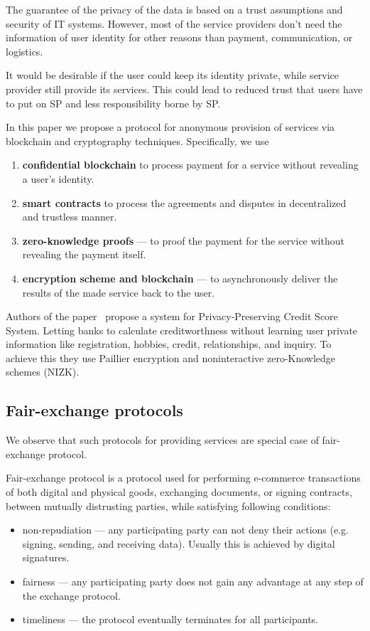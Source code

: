 \documentclass{article}
\begin{document}
The guarantee of the privacy of the data is based on a trust assumptions and security of IT systems. However, most of the service providers don't need the information of user identity for other reasons than payment, communication, or logistics. 

It would be desirable if the user could keep its identity private, while service provider still provide its services. This could lead to reduced trust that users have to put on SP and less responsibility borne by SP.

In this paper we propose a protocol for anonymous provision of services via blockchain and cryptography techniques. Specifically, we use
\begin{enumerate}
    \item \textbf{confidential blockchain} to process payment for a service without revealing a user's identity.
    \item \textbf{smart contracts} to process the agreements and disputes in decentralized and trustless manner.
    \item \textbf{zero-knowledge proofs} — to proof the payment for the service without revealing the payment itself.
    \item \textbf{encryption scheme and blockchain} — to asynchronously deliver the results of the made service back to the user.
\end{enumerate}


Authors of the paper~\cite{lin2021efficient} propose a system for Privacy-Preserving Credit Score System. Letting banks to calculate creditworthness without learning user private information like registration, hobbies, credit, relationships, and inquiry. To achieve this they use Paillier encryption and noninteractive zero-Knowledge schemes (NIZK).

\subsection{Fair-exchange protocols}

We observe that such protocols for providing services are special case of fair-exchange protocol.

Fair-exchange protocol is a protocol used for performing e-commerce transactions of both digital and physical goods, exchanging documents, or signing contracts, between mutually distrusting parties, while satisfying following conditions:
\begin{itemize}
    \item non-repudiation  — any participating party can not deny their actions (e.g. signing, sending, and receiving data). Usually this is achieved by digital signatures.
    \item fairness — any participating party does not gain any advantage at any step of the exchange protocol.
    \item timeliness — the protocol eventually terminates for all participants.
\end{itemize}
\end{document}
